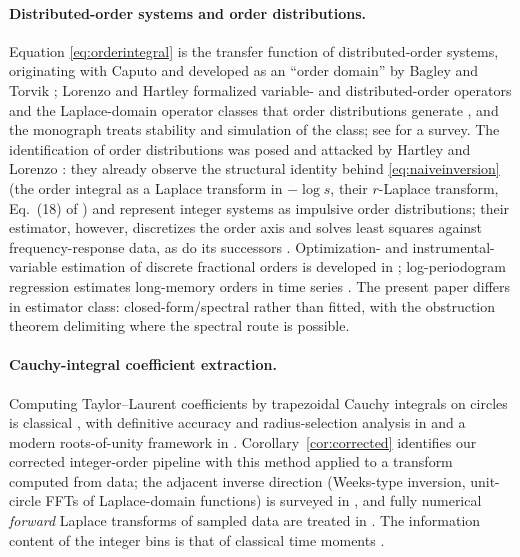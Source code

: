 \documentclass[11pt, a4paper]{article}
\theoremstyle{definition}
\theoremstyle{remark}
\begin{document}
\paragraph{Distributed-order systems and order distributions.}
Equation \eqref{eq:orderintegral} is the transfer function of
distributed-order systems, originating with Caputo
\cite{Caputo1969,Caputo1995,Caputo2001} and developed as an ``order
domain'' by Bagley and Torvik \cite{BagleyTorvik2000a, BagleyTorvik2000b};
Lorenzo and Hartley formalized variable- and distributed-order operators
\cite{LorenzoHartley2002} and the Laplace-domain operator classes that
order distributions generate \cite{HartleyLorenzo2011}, and the monograph
\cite{JiaoChenPodlubny2012} treats stability and simulation of the class;
see \cite{DingReview2021} for a survey. The identification of order
distributions was posed and attacked by Hartley and Lorenzo
\cite{HartleyLorenzo1999,HartleyLorenzo2003}: they already observe the
structural identity behind \eqref{eq:naiveinversion} (the order integral
as a Laplace transform in $-\log s$, their $r$-Laplace transform,
Eq.~(18) of \cite{HartleyLorenzo1999}) and represent integer systems as
impulsive order distributions; their estimator, however, discretizes the
order axis and solves least squares against frequency-response data, as do
its successors \cite{NazarianHaeri2010,DuanLi2021}. Optimization- and
instrumental-variable estimation of discrete fractional orders is
developed in \cite{VictorMalti2013,VictorMalti2022}; log-periodogram
regression estimates long-memory orders in time series
\cite{GewekePorterHudak1983}. The present paper differs in estimator
class: closed-form/spectral rather than fitted, with the obstruction
theorem delimiting where the spectral route is possible.

\paragraph{Cauchy-integral coefficient extraction.} Computing
Taylor--Laurent coefficients by trapezoidal Cauchy integrals on circles is
classical \cite{LynessMoler1967,Henrici1979,Fornberg1981}, with definitive
accuracy and radius-selection analysis in \cite{Bornemann2011} and a
modern roots-of-unity framework in \cite{AustinKravanjaTrefethen2014}.
Corollary~\ref{cor:corrected} identifies our corrected integer-order
pipeline with this method applied to a transform computed from data; the
adjacent inverse direction (Weeks-type inversion, unit-circle FFTs of
Laplace-domain functions) is surveyed in \cite{Weideman1999}, and fully
numerical \emph{forward} Laplace transforms of sampled data are treated in
\cite{WeidemanFornberg2023}. The information content of the integer bins
is that of classical time moments \cite{GibilaroLees1969}.
\end{document}
